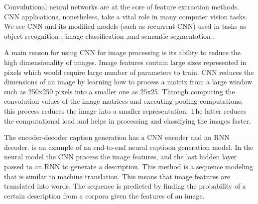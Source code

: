 Convulutional neural networks are at the core of feature extraction methods. CNN applications, nonetheless, take a vital role in many computer vision tasks. We see CNN and its modified models (such as recurrent-CNN) used in tasks as object recognition \cite{liang2015recurrent} \cite{objdet} \cite{Ren2015FasterRT} , image classification \cite{simonyan2014very} \cite{imclassfication},and  semantic segmentation \cite{hariharan2015hypercolumns} \cite{imseg}. 

A main reason for using CNN for image processing  is its ability to reduce the high dimensionality of images. Image features contain large sizes represented in pixels which would require large number of parameters to train. CNN reduces the dimensions of an image by learning how to process a matrix from a large window such as 250x250 pixels into a smaller one as 25x25. Through computing the convolution values of the image matrices and executing pooling computations, this process reduces the image into a smaller representation. The latter reduces the computational load and helps in processing and classifying the images faster.

The encoder-decoder caption generation has a CNN encoder and an RNN decoder.\cite{vinyals2015tell} is an example of an end-to-end neural captioon generation model. In the neural model the CNN process the image features, and the last hidden layer passed to an RNN to generate a description. This method is a sequence modeling that is similar to machine translation. This means that image features are translated into words. The sequence is predicted by finding the probability of a certain description from a corpora given the features of an image. 

